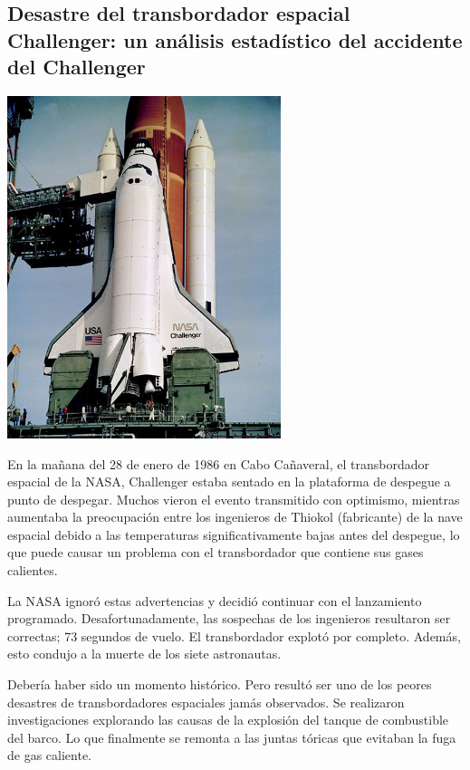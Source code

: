 \subsection*{Desastre del transbordador espacial Challenger: un análisis estadístico del accidente del Challenger}

\begin{center}  
\includegraphics[width=8cm, height=10cm]{figures/challenger.jpg}
\end{center}

En la mañana del 28 de enero de 1986 en Cabo Cañaveral, el transbordador
espacial de la NASA, Challenger estaba sentado en la plataforma de despegue a
punto de despegar. Muchos vieron el evento transmitido con optimismo, mientras
aumentaba la preocupación entre los ingenieros de Thiokol (fabricante) de la
nave espacial debido a las temperaturas significativamente bajas antes del
despegue, lo que puede causar un problema con el transbordador que contiene sus
gases calientes.

La NASA ignoró estas advertencias y decidió continuar con el lanzamiento
programado. Desafortunadamente, las sospechas de los ingenieros resultaron ser
correctas; 73 segundos de vuelo. El transbordador explotó por completo. Además,
esto condujo a la muerte de los siete astronautas.

Debería haber sido un momento histórico. Pero resultó ser uno de los peores
desastres de transbordadores espaciales jamás observados. Se realizaron
investigaciones explorando las causas de la explosión del tanque de combustible
del barco. Lo que finalmente se remonta a las juntas tóricas que evitaban la
fuga de gas caliente.

